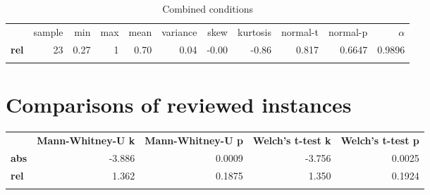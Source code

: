 \begin{longtable}[c]{@{}lrrrrrrrrrr@{}}
    \caption{Combined conditions}
    \endfirsthead
    \endhead
\toprule\addlinespace
& sample & min & max & mean & variance & skew & kurtosis & normal-t &
normal-p & $\alpha$
\\\addlinespace
\midrule
\textbf{rel} & 23 & 0.27 & 1 & 0.70 & 0.04 & -0.00 & -0.86 & 0.817 & 0.6647
& 0.9896
\\\addlinespace
\bottomrule
    \label{tab:instance_gen}
\end{longtable}

\section{Comparisons of reviewed instances}

\begin{longtable}[c]{@{}lrrrr@{}}
\toprule\addlinespace
& \textbf{Mann-Whitney-U k} & \textbf{Mann-Whitney-U p} &
\textbf{Welch's t-test k} & \textbf{Welch's t-test p}
\\\addlinespace
\midrule\endhead
\textbf{abs} & -3.886 & 0.0009 & -3.756 & 0.0025
\\\addlinespace
\textbf{rel} & 1.362 & 0.1875 & 1.350 & 0.1924
\\\addlinespace
\bottomrule
\end{longtable}

